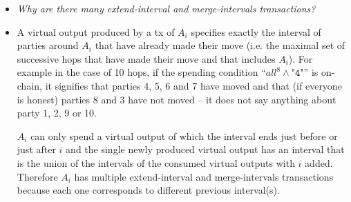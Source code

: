 \begin{itemize}
  \item \emph{Why are there many extend-interval and merge-intervals
  transactions?}
  \item A virtual output produced by a tx of $A_i$ specifies exactly the
  interval of parties around $A_i$ that have already made their move (i.e. the
  maximal set of successive hops that have made their move and that includes
  $A_i$). For example in the case of 10 hops, if the spending condition
  ``$\mathit{all}^8 \wedge \texttt{"4"}$'' is on-chain, it signifies that
  parties 4, 5, 6 and 7 have moved and that (if everyone is honest) parties 8 and 3
  have not moved -- it does not say anything about party 1, 2, 9 or 10.

  $A_i$ can only spend a virtual output of which the interval ends just before
  or just after $i$ and the single newly produced virtual output has an interval
  that is the union of the intervals of the consumed virtual outputs with $i$
  added.  Therefore $A_i$ has multiple extend-interval and merge-intervals
  transactions because each one corresponds to different previous interval(s).


\end{itemize}

